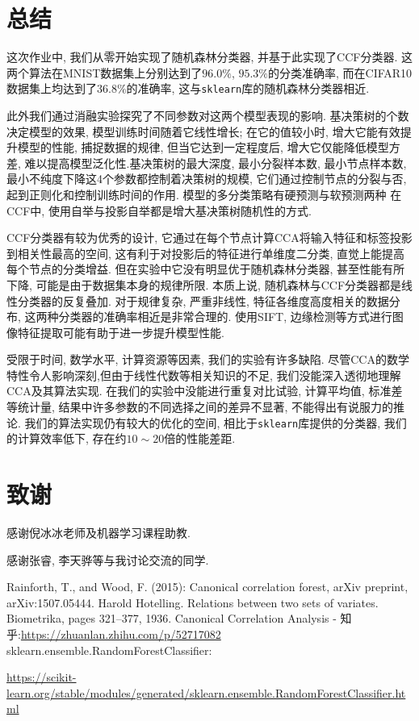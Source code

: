 \documentclass[a4paper]{article}
\begin{document}
\section{总结}

这次作业中, 我们从零开始实现了随机森林分类器, 并基于此实现了CCF分类器. 这两个算法在MNIST数据集上分别达到了$96.0\%$, $95.3\%$的分类准确率, 而在CIFAR10数据集上均达到了$36.8\%$的准确率, 这与\texttt{sklearn}库的随机森林分类器相近. 

此外我们通过消融实验探究了不同参数对这两个模型表现的影响. 基决策树的个数决定模型的效果, 模型训练时间随着它线性增长; 在它的值较小时, 增大它能有效提升模型的性能, 捕捉数据的规律, 但当它达到一定程度后, 增大它仅能降低模型方差, 难以提高模型泛化性.基决策树的最大深度, 最小分裂样本数, 最小节点样本数, 最小不纯度下降这4个参数都控制着决策树的规模, 它们通过控制节点的分裂与否, 起到正则化和控制训练时间的作用. 模型的多分类策略有硬预测与软预测两种 在CCF中, 使用自举与投影自举都是增大基决策树随机性的方式.

CCF分类器有较为优秀的设计, 它通过在每个节点计算CCA将输入特征和标签投影到相关性最高的空间, 这有利于对投影后的特征进行单维度二分类, 直觉上能提高每个节点的分类增益. 但在实验中它没有明显优于随机森林分类器, 甚至性能有所下降, 可能是由于数据集本身的规律所限. 本质上说, 随机森林与CCF分类器都是线性分类器的反复叠加. 对于规律复杂, 严重非线性, 特征各维度高度相关的数据分布, 这两种分类器的准确率相近是非常合理的. 使用SIFT, 边缘检测等方式进行图像特征提取可能有助于进一步提升模型性能.

受限于时间, 数学水平, 计算资源等因素, 我们的实验有许多缺陷. 尽管CCA的数学特性令人影响深刻,但由于线性代数等相关知识的不足, 我们没能深入透彻地理解CCA及其算法实现. 在我们的实验中没能进行重复对比试验, 计算平均值, 标准差等统计量, 结果中许多参数的不同选择之间的差异不显著, 不能得出有说服力的推论. 我们的算法实现仍有较大的优化的空间, 相比于\texttt{sklearn}库提供的分类器, 我们的计算效率低下, 存在约$10\sim 20$倍的性能差距.

\section{致谢}
感谢倪冰冰老师及机器学习课程助教.

感谢张睿, 李天骅等与我讨论交流的同学.

\begin{thebibliography}{99}  

Rainforth, T., and Wood, F. (2015): Canonical correlation forest, arXiv preprint, arXiv:1507.05444.
Harold Hotelling. Relations between two sets of variates. Biometrika, pages 321–377, 1936.
Canonical Correlation Analysis - 知乎:\href{https://zhuanlan.zhihu.com/p/52717082}{https://zhuanlan.zhihu.com/p/52717082}
sklearn.ensemble.RandomForestClassifier:

\href{ https://scikit-learn.org/stable/modules/generated/sklearn.ensemble.RandomForestClassifier.html#sklearn.ensemble.RandomForestClassifier}{https://scikit-learn.org/stable/modules/generated/sklearn.ensemble.RandomForestClassifier.html}
\end{thebibliography}
\end{document}
